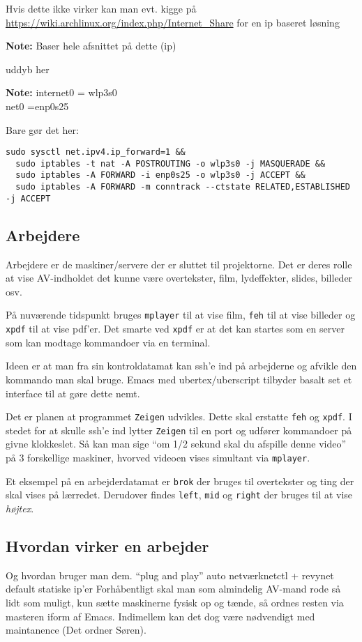 \documentclass[10pt,a4paper,danish]{article}
\newcommand{\note}[1]{\begin{mdframed}[style=note]\textbf{Note:}
    #1\end{mdframed}}
\begin{document}
Hvis dette ikke virker kan man evt. kigge på
\url{https://wiki.archlinux.org/index.php/Internet_Share} for en ip baseret løsning
\note{Baser hele afsnittet på dette (ip)

  uddyb her}

\note{internet0 = wlp3s0\\net0 =enp0s25}

Bare gør det her:
\begin{verbatim}
sudo sysctl net.ipv4.ip_forward=1 &&
  sudo iptables -t nat -A POSTROUTING -o wlp3s0 -j MASQUERADE &&
  sudo iptables -A FORWARD -i enp0s25 -o wlp3s0 -j ACCEPT &&
  sudo iptables -A FORWARD -m conntrack --ctstate RELATED,ESTABLISHED -j ACCEPT
\end{verbatim}

\subsection{Arbejdere}
Arbejdere er de maskiner/servere der er sluttet til projektorne. Det er deres
rolle at vise AV-indholdet det kunne være overtekster, film, lydeffekter,
slides, billeder osv.

På nuværende tidspunkt bruges \texttt{mplayer} til at vise film, \texttt{feh}
til at vise billeder og \texttt{xpdf} til at vise pdf'er.
Det smarte ved \texttt{xpdf} er at det kan startes som en server som kan modtage
kommandoer via en terminal.

Ideen er at man fra sin kontroldatamat kan ssh'e ind på arbejderne og afvikle
den kommando man skal bruge. Emacs med ubertex/uberscript tilbyder basalt set et
interface til at gøre dette nemt.

Det er planen at programmet \texttt{Zeigen} udvikles.
Dette skal erstatte \texttt{feh} og \texttt{xpdf}.
I stedet for at skulle ssh'e ind lytter \texttt{Zeigen} til en port og udfører
kommandoer på givne klokkeslet. Så kan man sige ``om 1/2 sekund skal du afspille
denne video'' på 3 forskellige maskiner, hvorved videoen vises simultant via
\texttt{mplayer}.


Et eksempel på en arbejderdatamat er \texttt{brok} der bruges til overtekster og ting der
skal vises på lærredet.
Derudover findes \texttt{left}, \texttt{mid} og \texttt{right} der bruges til at vise \textit{højtex}.


\subsection{Hvordan virker en arbejder}
Og hvordan bruger man dem.
``plug and play''
auto netværknetctl + revynet
default statiske ip'er
Forhåbentligt skal man som almindelig AV-mand rode så lidt som muligt, kun sætte
maskinerne fysisk op og tænde, så ordnes resten via masteren iform af Emacs.
Indimellem kan det dog være nødvendigt med maintanence (Det ordner Søren).
\end{document}
